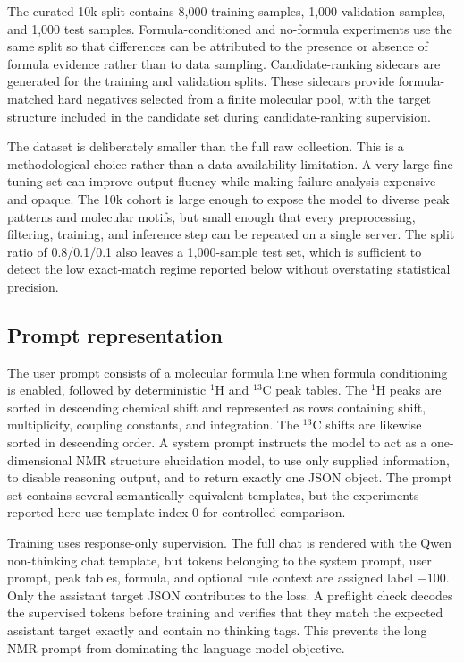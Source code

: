 \documentclass{article}
\begin{document}
The curated 10k split contains 8,000 training samples, 1,000 validation samples, and 1,000 test samples. Formula-conditioned and no-formula experiments use the same split so that differences can be attributed to the presence or absence of formula evidence rather than to data sampling. Candidate-ranking sidecars are generated for the training and validation splits. These sidecars provide formula-matched hard negatives selected from a finite molecular pool, with the target structure included in the candidate set during candidate-ranking supervision.

The dataset is deliberately smaller than the full raw collection. This is a methodological choice rather than a data-availability limitation. A very large fine-tuning set can improve output fluency while making failure analysis expensive and opaque. The 10k cohort is large enough to expose the model to diverse peak patterns and molecular motifs, but small enough that every preprocessing, filtering, training, and inference step can be repeated on a single server. The split ratio of 0.8/0.1/0.1 also leaves a 1,000-sample test set, which is sufficient to detect the low exact-match regime reported below without overstating statistical precision.

\subsection{Prompt representation}

The user prompt consists of a molecular formula line when formula conditioning is enabled, followed by deterministic \(^{1}\)H and \(^{13}\)C peak tables. The \(^{1}\)H peaks are sorted in descending chemical shift and represented as rows containing shift, multiplicity, coupling constants, and integration. The \(^{13}\)C shifts are likewise sorted in descending order. A system prompt instructs the model to act as a one-dimensional NMR structure elucidation model, to use only supplied information, to disable reasoning output, and to return exactly one JSON object. The prompt set contains several semantically equivalent templates, but the experiments reported here use template index 0 for controlled comparison.

Training uses response-only supervision. The full chat is rendered with the Qwen non-thinking chat template, but tokens belonging to the system prompt, user prompt, peak tables, formula, and optional rule context are assigned label \(-100\). Only the assistant target JSON contributes to the loss. A preflight check decodes the supervised tokens before training and verifies that they match the expected assistant target exactly and contain no thinking tags. This prevents the long NMR prompt from dominating the language-model objective.
\end{document}
